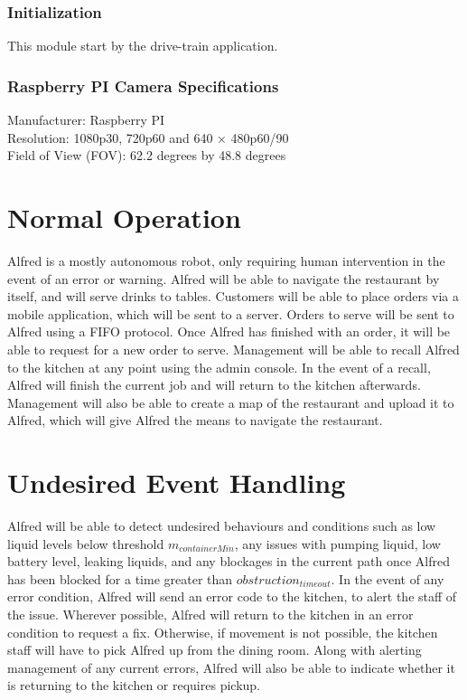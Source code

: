 \documentclass [10pt]{article}
\begin{document}
\subsubsection{Initialization}
This module start by the drive-train application.

\subsubsection{Raspberry PI Camera Specifications}
Manufacturer: Raspberry PI \\
Resolution: 1080p30, 720p60 and 640 × 480p60/90\\
Field of View (FOV): 62.2 degrees by 48.8 degrees\\

\section{Normal Operation}
Alfred is a mostly autonomous robot, only requiring human intervention in the event of an error or warning. Alfred will be able to navigate the restaurant by itself, and will serve drinks to tables. Customers will be able to place orders via a mobile application, which will be sent to a server. Orders to serve will be sent to Alfred using a FIFO protocol. Once Alfred has finished with an order, it will be able to request for a new order to serve. Management will be able to recall Alfred to the kitchen at any point using the admin console. In the event of a recall, Alfred will finish the current job and will return to the kitchen afterwards. Management will also be able to create a map of the restaurant and upload it to Alfred, which will give Alfred the means to navigate the restaurant.



\section{Undesired Event Handling}
Alfred will be able to detect undesired behaviours and conditions such as low liquid levels below threshold $ m_{containerMin} $, any issues with pumping liquid, low battery level, leaking liquids, and any blockages in the current path once Alfred has been blocked for a time greater than $ obstruction_{timeout} $. In the event of any error condition, Alfred will send an error code to the kitchen, to alert the staff of the issue. Wherever possible, Alfred will return to the kitchen in an error condition to request a fix. Otherwise, if movement is not possible, the kitchen staff will have to pick Alfred up from the dining room. Along with alerting management of any current errors, Alfred will also be able to indicate whether it is returning to the kitchen or requires pickup.
\end{document}
